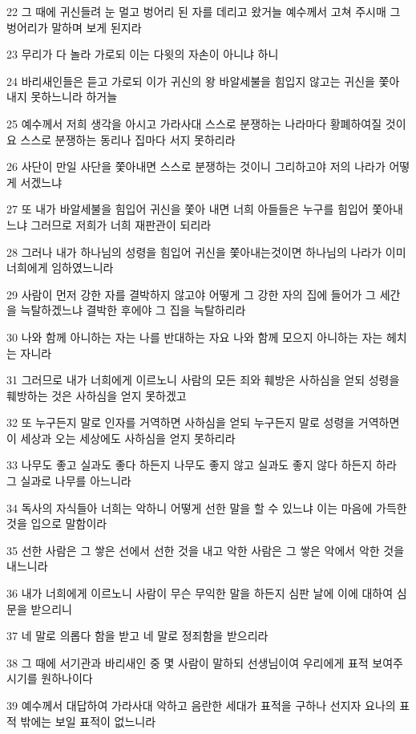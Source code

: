 \par 22 그 때에 귀신들려 눈 멀고 벙어리 된 자를 데리고 왔거늘 예수께서 고쳐 주시매 그 벙어리가 말하며 보게 된지라
\par 23 무리가 다 놀라 가로되 이는 다윗의 자손이 아니냐 하니
\par 24 바리새인들은 듣고 가로되 이가 귀신의 왕 바알세불을 힘입지 않고는 귀신을 쫓아 내지 못하느니라 하거늘
\par 25 예수께서 저희 생각을 아시고 가라사대 스스로 분쟁하는 나라마다 황폐하여질 것이요 스스로 분쟁하는 동리나 집마다 서지 못하리라
\par 26 사단이 만일 사단을 쫓아내면 스스로 분쟁하는 것이니 그리하고야 저의 나라가 어떻게 서겠느냐
\par 27 또 내가 바알세불을 힘입어 귀신을 쫓아 내면 너희 아들들은 누구를 힘입어 쫓아내느냐 그러므로 저희가 너희 재판관이 되리라
\par 28 그러나 내가 하나님의 성령을 힘입어 귀신을 쫓아내는것이면 하나님의 나라가 이미 너희에게 임하였느니라
\par 29 사람이 먼저 강한 자를 결박하지 않고야 어떻게 그 강한 자의 집에 들어가 그 세간을 늑탈하겠느냐 결박한 후에야 그 집을 늑탈하리라
\par 30 나와 함께 아니하는 자는 나를 반대하는 자요 나와 함께 모으지 아니하는 자는 헤치는 자니라
\par 31 그러므로 내가 너희에게 이르노니 사람의 모든 죄와 훼방은 사하심을 얻되 성령을 훼방하는 것은 사하심을 얻지 못하겠고
\par 32 또 누구든지 말로 인자를 거역하면 사하심을 얻되 누구든지 말로 성령을 거역하면 이 세상과 오는 세상에도 사하심을 얻지 못하리라
\par 33 나무도 좋고 실과도 좋다 하든지 나무도 좋지 않고 실과도 좋지 않다 하든지 하라 그 실과로 나무를 아느니라
\par 34 독사의 자식들아 너희는 악하니 어떻게 선한 말을 할 수 있느냐 이는 마음에 가득한 것을 입으로 말함이라
\par 35 선한 사람은 그 쌓은 선에서 선한 것을 내고 악한 사람은 그 쌓은 악에서 악한 것을 내느니라
\par 36 내가 너희에게 이르노니 사람이 무슨 무익한 말을 하든지 심판 날에 이에 대하여 심문을 받으리니
\par 37 네 말로 의롭다 함을 받고 네 말로 정죄함을 받으리라
\par 38 그 때에 서기관과 바리새인 중 몇 사람이 말하되 선생님이여 우리에게 표적 보여주시기를 원하나이다
\par 39 예수께서 대답하여 가라사대 악하고 음란한 세대가 표적을 구하나 선지자 요나의 표적 밖에는 보일 표적이 없느니라
